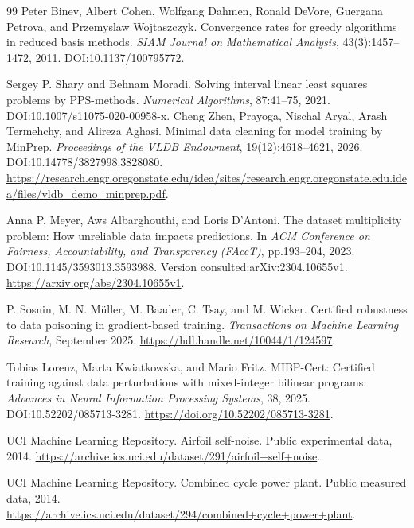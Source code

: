 \begin{thebibliography}{99}
Peter Binev, Albert Cohen, Wolfgang Dahmen, Ronald DeVore, Guergana Petrova, and Przemyslaw Wojtaszczyk.
\newblock Convergence rates for greedy algorithms in reduced basis methods.
\newblock \emph{SIAM Journal on Mathematical Analysis}, 43(3):1457--1472, 2011.
\newblock DOI:10.1137/100795772.

Sergey P. Shary and Behnam Moradi.
\newblock Solving interval linear least squares problems by PPS-methods.
\newblock \emph{Numerical Algorithms}, 87:41--75, 2021.
\newblock DOI:10.1007/s11075-020-00958-x.
Cheng Zhen, Prayoga, Nischal Aryal, Arash Termehchy, and Alireza Aghasi.
\newblock Minimal data cleaning for model training by MinPrep.
\newblock \emph{Proceedings of the VLDB Endowment}, 19(12):4618--4621, 2026.
\newblock DOI:10.14778/3827998.3828080.
\newblock \url{https://research.engr.oregonstate.edu/idea/sites/research.engr.oregonstate.edu.idea/files/vldb_demo_minprep.pdf}.

Anna P. Meyer, Aws Albarghouthi, and Loris D'Antoni.
\newblock The dataset multiplicity problem: How unreliable data impacts predictions.
\newblock In \emph{ACM Conference on Fairness, Accountability, and Transparency (FAccT)}, pp.193--204, 2023.
\newblock DOI:10.1145/3593013.3593988. Version consulted:arXiv:2304.10655v1.
\newblock \url{https://arxiv.org/abs/2304.10655v1}.

P. Sosnin, M. N. M\"uller, M. Baader, C. Tsay, and M. Wicker.
\newblock Certified robustness to data poisoning in gradient-based training.
\newblock \emph{Transactions on Machine Learning Research}, September 2025.
\newblock \url{https://hdl.handle.net/10044/1/124597}.


Tobias Lorenz, Marta Kwiatkowska, and Mario Fritz.
\newblock MIBP-Cert: Certified training against data perturbations with mixed-integer bilinear programs.
\newblock \emph{Advances in Neural Information Processing Systems}, 38, 2025.
\newblock DOI:10.52202/085713-3281.
\newblock \url{https://doi.org/10.52202/085713-3281}.

UCI Machine Learning Repository.
\newblock Airfoil self-noise. Public experimental data, 2014.
\newblock \url{https://archive.ics.uci.edu/dataset/291/airfoil+self+noise}.

UCI Machine Learning Repository.
\newblock Combined cycle power plant. Public measured data, 2014.
\newblock \url{https://archive.ics.uci.edu/dataset/294/combined+cycle+power+plant}.


\end{thebibliography}
